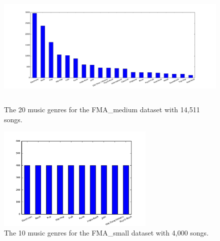\documentclass{article}
\begin{document}
\begin{figure}[h!]
\centering
\includegraphics[height=6cm]{histo_medium.pdf}
\vspace{-0.5cm}
\caption{The 20 music genres for the FMA\_medium dataset with 14,511 songs.}
\label{fig_medium}
\end{figure}


\begin{figure}[h!]
\centering
\includegraphics[height=5cm]{histo_small.pdf}
\vspace{-0.5cm}
\caption{The 10 music genres for the FMA\_small dataset with 4,000 songs.}
\label{fig_small}
\end{figure}
\end{document}
